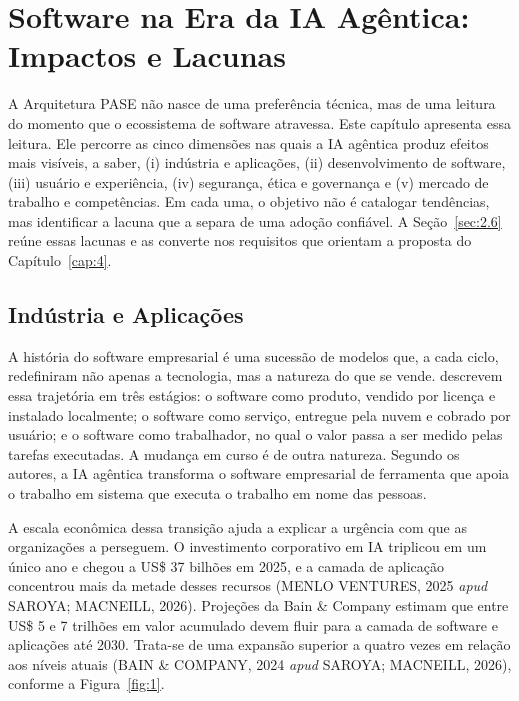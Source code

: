 
\chapter{Software na Era da IA Agêntica: Impactos e Lacunas}\label{cap:2}

A Arquitetura PASE não nasce de uma preferência técnica, mas de uma leitura do momento que o ecossistema de software atravessa. Este capítulo apresenta essa leitura. Ele percorre as cinco dimensões nas quais a IA agêntica produz efeitos mais visíveis, a saber, (i) indústria e aplicações, (ii) desenvolvimento de software, (iii) usuário e experiência, (iv) segurança, ética e governança e (v) mercado de trabalho e competências. Em cada uma, o objetivo não é catalogar tendências, mas identificar a lacuna que a separa de uma adoção confiável. A Seção~\ref{sec:2.6} reúne essas lacunas e as converte nos requisitos que orientam a proposta do Capítulo~\ref{cap:4}.

\section{Indústria e Aplicações}\label{sec:2.1}

A história do software empresarial é uma sucessão de modelos que, a cada ciclo, redefiniram não apenas a tecnologia, mas a natureza do que se vende.  descrevem essa trajetória em três estágios: o software como produto, vendido por licença e instalado localmente; o software como serviço, entregue pela nuvem e cobrado por usuário; e o software como trabalhador, no qual o valor passa a ser medido pelas tarefas executadas. A mudança em curso é de outra natureza. Segundo os autores, a IA agêntica transforma o software empresarial de ferramenta que apoia o trabalho em sistema que executa o trabalho em nome das pessoas.

A escala econômica dessa transição ajuda a explicar a urgência com que as organizações a perseguem. O investimento corporativo em IA triplicou em um único ano e chegou a US\$ 37 bilhões em 2025, e a camada de aplicação concentrou mais da metade desses recursos (MENLO VENTURES, 2025 \textit{apud} SAROYA; MACNEILL, 2026)\nocite{vista2026outlook}. Projeções da Bain \& Company estimam que entre US\$ 5 e 7 trilhões em valor acumulado devem fluir para a camada de software e aplicações até 2030. Trata-se de uma expansão superior a quatro vezes em relação aos níveis atuais (BAIN \& COMPANY, 2024 \textit{apud} SAROYA; MACNEILL, 2026)\nocite{vista2026outlook}, conforme a Figura~\ref{fig:1}.

